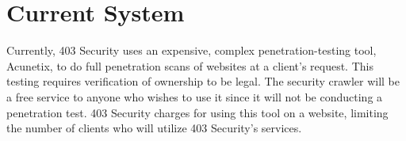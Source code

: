 \section{Current System}
Currently, 403 Security uses an expensive, complex penetration-testing tool, Acunetix, to do full penetration scans of websites at a client’s request.  This testing requires verification of ownership to be legal. The security crawler will be a free service to anyone who wishes to use it since it will not be conducting a penetration test.
403 Security charges for using this tool on a website, limiting the number of clients who will utilize 403 Security’s services. 
